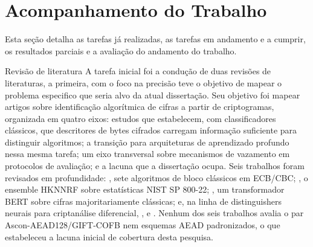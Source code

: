 %
%

\chapter{Acompanhamento do Trabalho}
Esta seção detalha as tarefas já realizadas, as tarefas em andamento e a cumprir, os resultados parciais e a avaliação do andamento do trabalho.


\begin{tarefac} Revisão de literatura 
A tarefa inicial foi a condução de duas revisões de literaturas, a primeira, com o foco na precisão teve o objetivo de mapear o problema especifico que seria alvo da atual dissertação. Seu objetivo foi mapear artigos sobre identificação algorítmica de cifras a partir de criptogramas, organizada em quatro eixos: estudos que estabelecem, com classificadores clássicos, que descritores de bytes cifrados carregam informação suficiente para distinguir algoritmos; a transição para arquiteturas de aprendizado profundo nessa mesma tarefa; um eixo transversal sobre mecanismos de vazamento em protocolos de avaliação; e a lacuna que a dissertação ocupa. Seis trabalhos foram revisados em profundidade: \citet{mello_xexeo_2018}, sete algoritmos de bloco clássicos em ECB/CBC; \citet{yuan2022}, o ensemble HKNNRF sobre estatísticas NIST SP 800-22; \citet{sikdar_kule_2024}, um transformador BERT sobre cifras majoritariamente clássicas; e, na linha de distinguishers neurais para criptanálise diferencial, \citet{gohr_2019}, \citet{benamira_2021} e \citet{su2025neural}. Nenhum dos seis trabalhos avalia o par Ascon-AEAD128/GIFT-COFB nem esquemas AEAD padronizados, o que estabeleceu a lacuna inicial de cobertura desta pesquisa.


\end{tarefac}
